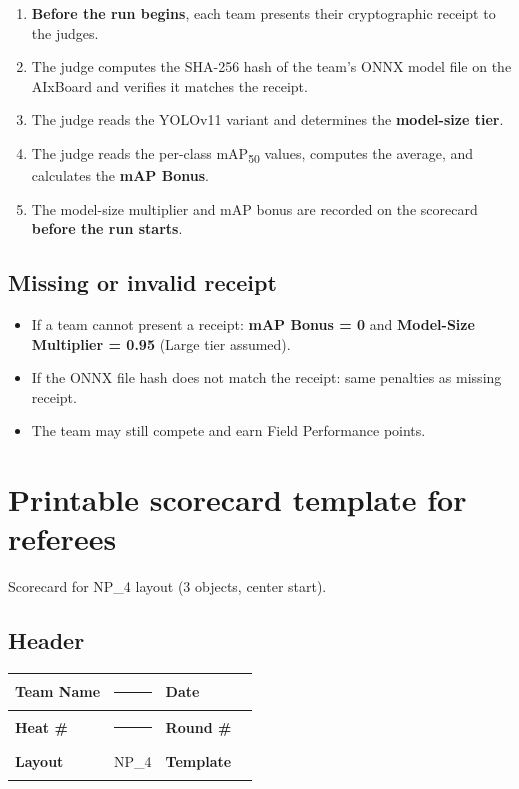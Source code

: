 \documentclass[a4]{article}
\begin{document}
\begin{enumerate}
    \item \textbf{Before the run begins}, each team presents their cryptographic receipt to the judges.
    \item The judge computes the SHA-256 hash of the team's ONNX model file on the AIxBoard and verifies it matches the receipt.
    \item The judge reads the YOLOv11 variant and determines the \textbf{model-size tier}.
    \item The judge reads the per-class mAP\textsubscript{50} values, computes the average, and calculates the \textbf{mAP Bonus}.
    \item The model-size multiplier and mAP bonus are recorded on the scorecard \textbf{before the run starts}.
\end{enumerate}

\subsection*{Missing or invalid receipt}

\begin{itemize}
    \item If a team cannot present a receipt: \textbf{mAP Bonus = 0} and \textbf{Model-Size Multiplier = 0.95} (Large tier assumed).
    \item If the ONNX file hash does not match the receipt: same penalties as missing receipt.
    \item The team may still compete and earn Field Performance points.
\end{itemize}

\section*{Printable scorecard template for referees} 
Scorecard for NP\_4 layout (3 objects, center start).

\subsection*{Header}

\begin{table}[H]
\centering
\begin{tabular}{|l|p{5cm}|l|p{3cm}|}
\hline
\textbf{Team Name} & \rule{5cm}{0.4pt} & \textbf{Date} & \rule{3cm}{0.4pt} \\
\hline
\textbf{Heat \#} & \rule{5cm}{0.4pt} & \textbf{Round \#} & \rule{3cm}{0.4pt} \\
\hline
\textbf{Layout} & NP\_4 & \textbf{Template} & \rule{3cm}{0.4pt} \\
\hline
\end{tabular}
\end{table}
\end{document}
